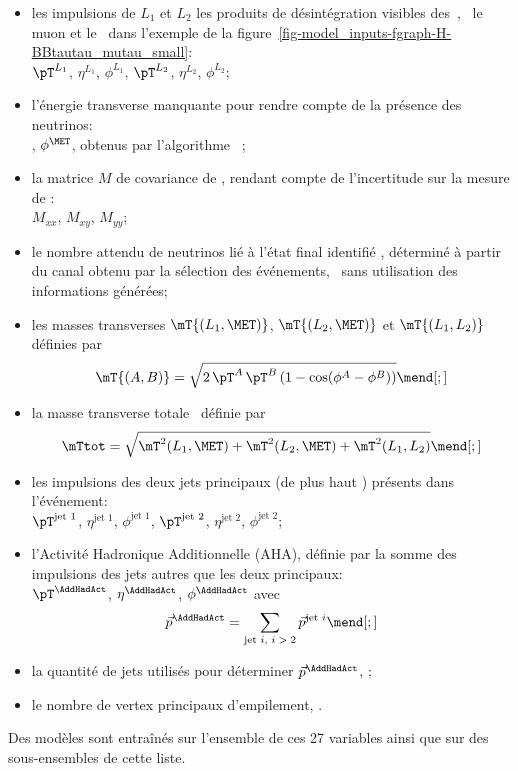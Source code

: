\begin{itemize}
\item les impulsions de $L_1$ et $L_2$ les produits de désintégration visibles des~\tau,
\ie\ le muon et le \tauh\ dans l'exemple de la figure~\ref{fig-model_inputs-fgraph-H-BBtautau_mutau_small}:\\
$\pT^{L_1}$, $\eta^{L_1}$, $\phi^{L_1}$,
$\pT^{L_2}$, $\eta^{L_2}$, $\phi^{L_2}$;
\item l'énergie transverse manquante pour rendre compte de la présence des neutrinos:\\
\MET, $\phi^{\MET}$, obtenus par l'algorithme \PUPPI~\cite{PUPPI};
\item la matrice $M$ de covariance de \MET, rendant compte de l'incertitude sur la mesure de \MET:\\
$M_{xx}$, $M_{xy}$, $M_{yy}$;
\item le nombre attendu de neutrinos lié à l'état final identifié \Nnu,
déterminé à partir du canal obtenu par la sélection des événements, \ie\ sans utilisation des informations générées;
\item les masses transverses
$\mT {(L_1,\MET)}$,
$\mT {(L_2,\MET)}$ et
$\mT {(L_1,L_2)}$
définies par
\begin{equation}
\mT {(A,B)} = \sqrt{2 \, \pT^{A} \, \pT^{B} \, (1-\cos(\phi^A-\phi^B))}
\mend[;]
\end{equation}
\item la masse transverse totale \mTtot\ définie par
\begin{equation}
\mTtot = \sqrt{\mT^2 {(L_1,\MET)} + \mT^2 {(L_2,\MET)} + \mT^2 {(L_1,L_2)}}
\mend[;]
\end{equation}
\item les impulsions des deux jets principaux (de plus haut \pT) présents dans l'événement:\\
$\pT^\text{jet 1}$, $\eta^\text{jet 1}$, $\phi^\text{jet 1}$,
$\pT^\text{jet 2}$, $\eta^\text{jet 2}$, $\phi^\text{jet 2}$;
\item l'Activité Hadronique Additionnelle (AHA), définie par la somme des impulsions des jets autres que les deux principaux:\\
$\pT^{\AddHadAct}$, $\eta^{\AddHadAct}$, $\phi^{\AddHadAct}$ avec
\begin{equation}
\vec{p}^{\AddHadAct} = \sum_\text{jet $i$, $i > 2$} \vec{p}^\text{jet $i$}
\mend[;]
\end{equation}
\item la quantité de jets utilisés pour déterminer $\vec{p}^{\AddHadAct}$, \Njetsr;
\item le nombre de vertex principaux d'empilement, \Npu.
\end{itemize}
Des modèles sont entraînés sur l'ensemble de ces 27 variables ainsi que sur des sous-ensembles de cette liste.